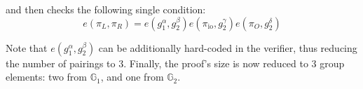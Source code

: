 \documentclass[../lecture-notes.tex]{subfiles}
\begin{document}
and then checks the following single condition:
\begin{equation*}
    e(\pi_L, \pi_R) = e(g_1^{\alpha}, g_2^{\beta})e(\pi_{\text{io}},g_2^{\gamma})e(\pi_O,g_2^{\delta})
\end{equation*}

Note that $e(g_1^{\alpha}, g_2^{\beta})$ can be additionally hard-coded in the verifier, thus reducing the number of pairings to 3. Finally, the proof's size is now reduced to 3 group elements: two from $\mathbb{G}_1$, and one from $\mathbb{G}_2$.
\end{document}
